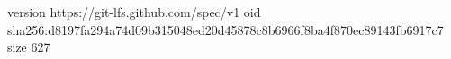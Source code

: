 version https://git-lfs.github.com/spec/v1
oid sha256:d8197fa294a74d09b315048ed20d45878c8b6966f8ba4f870ec89143fb6917c7
size 627
